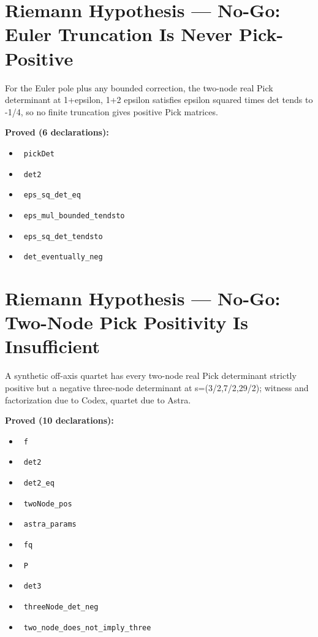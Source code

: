 \documentclass{report}
\theoremstyle{definition}
\begin{document}
\section{Riemann Hypothesis --- No-Go: Euler Truncation Is Never Pick-Positive}
For the Euler pole plus any bounded correction, the two-node real Pick determinant at 1+epsilon, 1+2 epsilon satisfies epsilon squared times det tends to -1/4, so no finite truncation gives positive Pick matrices.

\noindent\textbf{Proved (6 declarations):}
\begin{itemize}
  \item {}\leanok\ \texttt{pickDet}
  \item {}\leanok\ \texttt{det2}
  \item {}\leanok\ \texttt{eps\_sq\_det\_eq}
  \item {}\leanok\ \texttt{eps\_mul\_bounded\_tendsto}
  \item {}\leanok\ \texttt{eps\_sq\_det\_tendsto}
  \item {}\leanok\ \texttt{det\_eventually\_neg}
\end{itemize}

\section{Riemann Hypothesis --- No-Go: Two-Node Pick Positivity Is Insufficient}
A synthetic off-axis quartet has every two-node real Pick determinant strictly positive but a negative three-node determinant at s=(3/2,7/2,29/2); witness and factorization due to Codex, quartet due to Astra.

\noindent\textbf{Proved (10 declarations):}
\begin{itemize}
  \item {}\leanok\ \texttt{f}
  \item {}\leanok\ \texttt{det2}
  \item {}\leanok\ \texttt{det2\_eq}
  \item {}\leanok\ \texttt{twoNode\_pos}
  \item {}\leanok\ \texttt{astra\_params}
  \item {}\leanok\ \texttt{fq}
  \item {}\leanok\ \texttt{P}
  \item {}\leanok\ \texttt{det3}
  \item {}\leanok\ \texttt{threeNode\_det\_neg}
  \item {}\leanok\ \texttt{two\_node\_does\_not\_imply\_three}
\end{itemize}
\end{document}
